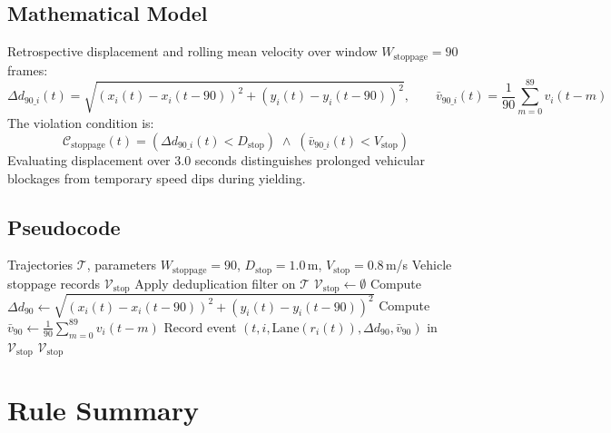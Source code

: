 \documentclass[12pt,a4paper]{report}
\begin{document}
\subsection{Mathematical Model}
Retrospective displacement and rolling mean velocity over window $W_{\text{stoppage}} = 90$ frames:
\begin{equation}
    \Delta d_{90\_i}(t) = \sqrt{(x_i(t)-x_i(t{-}90))^2 + (y_i(t)-y_i(t{-}90))^2}, \qquad
    \bar{v}_{90\_i}(t) = \frac{1}{90}\sum_{m=0}^{89} v_i(t-m)
\end{equation}
The violation condition is:
\begin{equation}
    \mathcal{C}_{\text{stoppage}}(t) = \left( \Delta d_{90\_i}(t) < D_{\text{stop}} \right) \;\land\; \left( \bar{v}_{90\_i}(t) < V_{\text{stop}} \right)
\end{equation}
Evaluating displacement over 3.0 seconds distinguishes prolonged vehicular blockages from temporary speed dips during yielding.

\subsection{Pseudocode}
\begin{algorithm}[H]
\caption{Vehicle Stoppage Detection Algorithm}
\label{alg:rule5}
\begin{algorithmic}[1]
\Require Trajectories $\mathcal{T}$, parameters $W_{\text{stoppage}} = 90$, $D_{\text{stop}} = 1.0$\,m, $V_{\text{stop}} = 0.8$\,m/s
\Ensure Vehicle stoppage records $\mathcal{V}_{\text{stop}}$
\State Apply deduplication filter on $\mathcal{T}$
\State $\mathcal{V}_{\text{stop}} \gets \emptyset$
        \State Compute $\Delta d_{90} \gets \sqrt{(x_i(t)-x_i(t-90))^2 + (y_i(t)-y_i(t-90))^2}$
        \State Compute $\bar{v}_{90} \gets \frac{1}{90}\sum_{m=0}^{89} v_i(t-m)$
            \State Record event $(t, i, \mathrm{Lane}(r_i(t)), \Delta d_{90}, \bar{v}_{90})$ in $\mathcal{V}_{\text{stop}}$
        \EndIf
    \EndFor
\EndFor
\State \Return $\mathcal{V}_{\text{stop}}$
\end{algorithmic}
\end{algorithm}

\section{Rule Summary}
\end{document}
